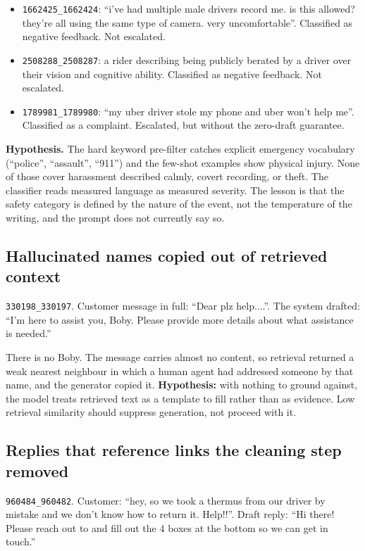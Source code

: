 \documentclass[11pt,a4paper]{article}
\begin{document}
\begin{itemize}
\item \texttt{1662425\_1662424}: ``i've had multiple male drivers record me. is this
allowed? they're all using the same type of camera. very uncomfortable''. Classified as
negative feedback. Not escalated.
\item \texttt{2508288\_2508287}: a rider describing being publicly berated by a driver
over their vision and cognitive ability. Classified as negative feedback. Not escalated.
\item \texttt{1789981\_1789980}: ``my uber driver stole my phone and uber won't help
me''. Classified as a complaint. Escalated, but without the zero-draft guarantee.
\end{itemize}

\textbf{Hypothesis.} The hard keyword pre-filter catches explicit emergency vocabulary
(``police'', ``assault'', ``911'') and the few-shot examples show physical injury. None
of those cover harassment described calmly, covert recording, or theft. The classifier
reads measured language as measured severity. The lesson is that the safety category is
defined by the nature of the event, not the temperature of the writing, and the prompt
does not currently say so.

\subsection{Hallucinated names copied out of retrieved context}

\texttt{330198\_330197}. Customer message in full: ``Dear plz help....''. The system
drafted: ``I'm here to assist you, Boby. Please provide more details about what
assistance is needed.''

There is no Boby. The message carries almost no content, so retrieval returned a weak
nearest neighbour in which a human agent had addressed someone by that name, and the
generator copied it. \textbf{Hypothesis:} with nothing to ground against, the model
treats retrieved text as a template to fill rather than as evidence. Low retrieval
similarity should suppress generation, not proceed with it.

\subsection{Replies that reference links the cleaning step removed}

\texttt{960484\_960482}. Customer: ``hey, so we took a thermus from our driver by mistake
and we don't know how to return it. Help!!''. Draft reply: ``Hi there! Please reach out
to and fill out the 4 boxes at the bottom so we can get in touch.''
\end{document}
